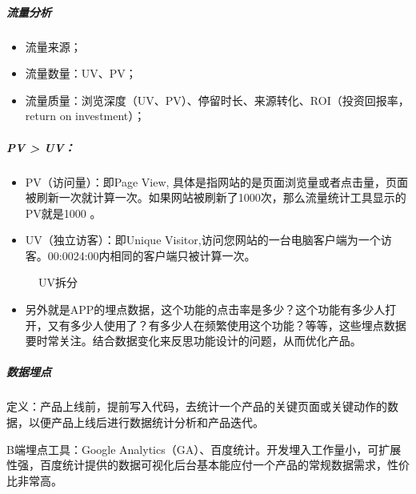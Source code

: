 \documentclass[letterpaper,11pt,english]{sphinxmanual}
\begin{document}
\subparagraph{流量分析}
\label{\detokenize{chapter_knowledge/data_analysis:id12}}\begin{itemize}
\item {} 
流量来源；

\item {} 
流量数量：UV、PV；

\item {} 
流量质量：浏览深度（UV、PV）、停留时长、来源转化、ROI（投资回报率，return
on investment）；

\end{itemize}


\subparagraph{PV > UV：}
\label{\detokenize{chapter_knowledge/data_analysis:pv-uv}}\begin{itemize}
\item {} 
PV（访问量）：即Page View,
具体是指网站的是页面浏览量或者点击量，页面被刷新一次就计算一次。如果网站被刷新了1000次，那么流量统计工具显示的PV就是1000
。

\item {} 
UV（独立访客）：即Unique
Visitor,访问您网站的一台电脑客户端为一个访客。00:00\sphinxhyphen{}24:00内相同的客户端只被计算一次。

\end{itemize}

\begin{figure}[H]
\centering
\capstart

\noindent{}
\caption{UV拆分}\label{\detokenize{chapter_knowledge/data_analysis:id22}}\end{figure}
\begin{itemize}
\item {} 
另外就是APP的埋点数据，这个功能的点击率是多少？这个功能有多少人打开，又有多少人使用了？有多少人在频繁使用这个功能？等等，这些埋点数据要时常关注。结合数据变化来反思功能设计的问题，从而优化产品。

\end{itemize}


\subparagraph{数据埋点}
\label{\detokenize{chapter_knowledge/data_analysis:id13}}
定义：产品上线前，提前写入代码，去统计一个产品的关键页面或关键动作的数据，以便产品上线后进行数据统计分析和产品迭代。%
\begin{footnote}[578]\sphinxAtStartFootnote
{}
%
\end{footnote}

B端埋点工具：Google
Analytics（GA）、百度统计。开发埋入工作量小，可扩展性强，百度统计提供的数据可视化后台基本能应付一个产品的常规数据需求，性价比非常高。
\end{document}
